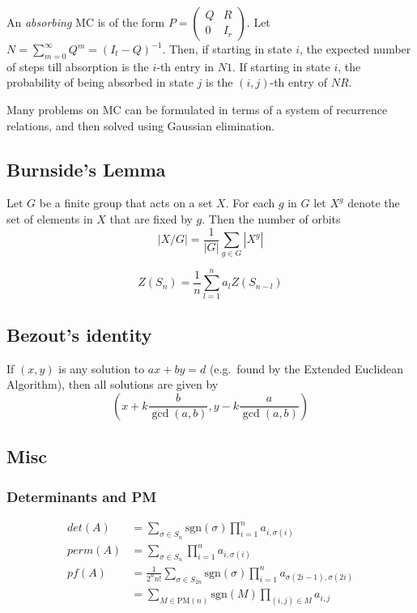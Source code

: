 \documentclass[15pt,a4paper]{article}
\begin{document}
\begin{landscape}
\begin{multicols*}{3}
An \textit{absorbing} MC is of the form $P = \left(\begin{matrix} Q & R
\\ 0 & I_r \end{matrix}\right)$. Let $N = \sum_{m=0}^\infty Q^m = (I_t
- Q)^{-1}$. Then, if starting in state $i$, the expected number of
steps till absorption is the $i$-th entry in $N1$. If starting in state
$i$, the probability of being absorbed in state $j$ is the $(i,j)$-th
entry of $NR$.

Many problems on MC can be formulated in terms of a system of
recurrence relations, and then solved using Gaussian elimination.

\subsection{Burnside's Lemma}
Let $G$ be a finite group that acts on a set $X$. For each $g$ in $G$
let $X^g$ denote the set of elements in $X$ that are fixed by $g$. Then
the number of orbits \[ |X/G| = \frac{1}{|G|} \sum_{g\in G} |X^g| \]

\[
Z(S_n) = \frac{1}{n} \sum_{l=1}^n a_l Z(S_{n-l})
\]

\subsection{Bezout's identity}
If $(x,y)$ is any solution to $ax+by=d$ (e.g.\ found by the Extended
Euclidean Algorithm), then all solutions are given by \[
\left(x+k\frac{b}{\gcd(a,b)}, y-k\frac{a}{\gcd(a,b)}\right) \]

\subsection{Misc}
\subsubsection{Determinants and PM}
\begin{align*}
det(A) &= \sum_{\sigma \in S_n}\text{sgn}(\sigma)\prod_{i = 1}^n a_{i,\sigma(i)}\\
perm(A) &= \sum_{\sigma \in S_n} \prod_{i = 1}^n a_{i,\sigma(i)}\\
pf(A) &= \frac{1}{2^nn!}\sum_{\sigma \in S_{2n}} \text{sgn}(\sigma)\prod_{i = 1}^n a_{\sigma(2i-1),\sigma(2i)}\\ &= \sum_{M \in \text{PM}(n)} \text{sgn}(M) \prod_{(i,j) \in M} a_{i,j}
\end{align*}


\end{multicols*}
\end{landscape}
\end{document}
